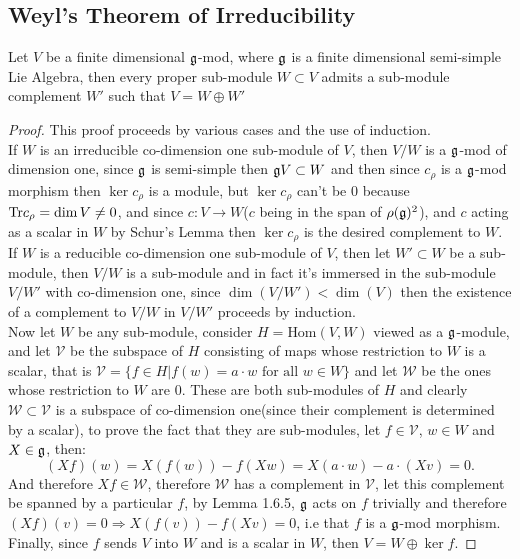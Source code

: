 \subsection*{Weyl's Theorem of Irreducibility}
\begin{teo}
	Let $V$ be a finite dimensional $\mathfrak{g}$-mod, where $\mathfrak{g}$ is a finite dimensional semi-simple Lie Algebra, then every proper sub-module $W\subset V$ admits a sub-module complement $W'$ such that $V=W\oplus W'$
	\label{Weyl's Theorem}
\end{teo}
\begin{proof}
	This proof proceeds by various cases and the use of induction.\\
	If $W$ is an irreducible co-dimension one sub-module of $V$, then $V/W$ is a $\mathfrak{g}$-mod of dimension one, since $\mathfrak{g}$ is semi-simple then $\mathfrak{g} V \subset W$ and then since $c_\rho$ is a $\mathfrak{g}$-mod morphism then $\ker c_\rho$ is a module, but $\ker c_\rho$ can't be $0$ because $\text{Tr} c_\rho = \dim V \not=0$, and since $c:V\rightarrow W$($c$ being in the span of $\rho(\mathfrak{g})^2$), and $c$ acting as a scalar in $W$ by Schur's Lemma then $\ker c_\rho$ is the desired complement to $W$.\\
	If $W$ is a reducible co-dimension one sub-module of $V$, then let $W'\subset W$ be a sub-module, then $V/W$ is a sub-module and in fact it's immersed in the sub-module $V/W'$ with co-dimension one, since $\dim(V/W')<\dim(V)$ then the existence of a complement to $V/W$ in $V/W'$ proceeds by induction.\\
	Now let $W$ be any sub-module, consider $H=\text{Hom}(V,W)$ viewed as a $\mathfrak{g}$-module, and let $\mathcal{V}$ be the subspace of $H$ consisting of maps whose restriction to $W$ is a scalar, that is $\mathcal{V}=\{f \in H | f(w)=a\cdot w \text{ for all } w \in W\}$ and let $\mathcal{W}$ be the ones whose restriction to $W$ are $0$. These are both sub-modules of $H$ and clearly $\mathcal{W} \subset \mathcal{V}$ is a subspace of co-dimension one(since their complement is determined by a scalar), to prove the fact that they are sub-modules, let $f \in \mathcal{V}$, $w \in W$ and $X \in \mathfrak{g}$, then:
	$$(Xf)(w) = X(f(w)) - f(Xw) = X(a\cdot w)-a\cdot (Xv) = 0.$$
	And therefore $Xf \in \mathcal{W}$, therefore $\mathcal{W}$ has a complement in $\mathcal{V}$, let this complement be spanned by a particular $f$, by Lemma 1.6.5, $\mathfrak{g}$ acts on $f$ trivially and therefore $(Xf)(v) = 0 \Rightarrow X(f(v)) - f(Xv)=0$, i.e that $f$ is a $\mathfrak{g}$-mod morphism. Finally, since $f$ sends $V$ into $W$ and is a scalar in $W$, then $V=W \oplus \ker f$. 
\end{proof} 
